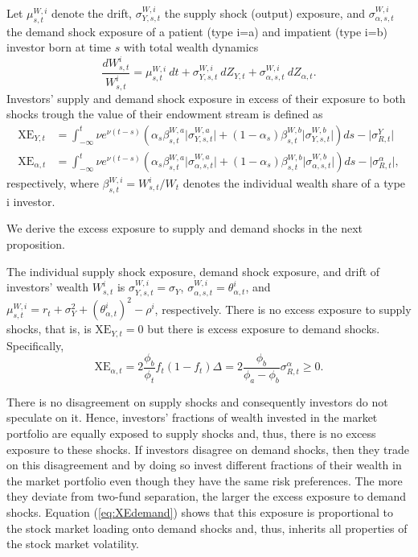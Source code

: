  \begin{defn}\label{Def:TotExpsure}
 Let $\mu^{W,i}_{s,t}$ denote the drift, $\sigma^{W,i}_{Y,s,t}$ the supply shock (output) exposure, and $\sigma^{W,i}_{\alpha,s,t}$ the demand shock exposure of a patient (type i=a) and impatient (type i=b) investor born at time $s$ with total wealth dynamics
 \begin{equation} \label{eq:totwealthind}
 \frac{dW^i_{s,t}}{W^i_{s,t}} = \mu^{W,i}_{s,t} \:  dt + \sigma^{W,i}_{Y,s,t} \: dZ_{Y,t}  
	+ \sigma^{W,i}_{\alpha,s,t} \: dZ_{\alpha,t}.
\end{equation}
Investors' supply and demand shock exposure in excess of their exposure to both shocks trough the value of their endowment stream is defined as 
\begin{align}\label{eq:XE_Y}
   \text{XE}_{Y,t} &= \int_{-\infty}^{t} \nu e^{\nu \left(t-s\right)}\left(\alpha_s \beta^{W,a}_{s,t} \lvert  \sigma^{W,a}_{Y,s,t} \rvert 
 +\left(1-\alpha_s\right) \beta^{W,b}_{s,t} \lvert \sigma^{W,b}_{Y,s,t}  \rvert \right)ds  -  \lvert \sigma^{Y}_{R,t}\rvert \\
  \text{XE}_{\alpha,t} &= \int_{-\infty}^{t} \nu e^{\nu \left(t-s\right)}\left(\alpha_s \beta^{W,a}_{s,t}  \lvert \sigma^{W,a}_{\alpha,s,t} \rvert 
 +\left(1-\alpha_s\right)\beta^{W,b}_{s,t} \lvert  \sigma^{W,b}_{\alpha,s,t}  \rvert \right)ds -  \lvert \sigma^{\alpha}_{R,t}\rvert,
\end{align} 
respectively, where $\beta^{W,i}_{s,t} =  W^i_{s,t}/ W_t$ denotes the individual wealth share of a type i investor. 
\end{defn}
We derive the excess exposure to supply and demand shocks in the next proposition.
\begin{prop}\label{prop:Exposure}
 The individual supply shock exposure, demand shock exposure, and drift of investors' wealth $W^i_{s,t}$ is $ \sigma^{W,i}_{Y,s,t} = \sigma_Y$,  $\sigma^{W,i}_{\alpha,s,t} = \theta_{\alpha,t}^i$, and $\mu^{W,i}_{s,t} =  r_t +\sigma_Y^2+\left( \theta_{\alpha,t}^i \right)^2 -\rho^i$, respectively. 
There is no excess exposure to supply shocks, that is,  is $\text{XE}_{Y,t} =0$ but there is excess exposure to demand shocks. Specifically,
 \begin{equation}\label{eq:XEdemand}
	\text{XE}_{\alpha,t}= 2 \frac{\phi_b}{\phi_t}  f_t  \left(1-f_t\right) \Delta = 2 \frac{\phi_b}{\phi_a-\phi_b} \sigma^{\alpha}_{R,t} \geq 0. 
\end{equation}
\end{prop} 
There is no disagreement on supply shocks and consequently investors do not speculate on it. Hence, investors' fractions of wealth invested in the market portfolio are equally exposed to supply shocks and, thus, there is no excess exposure to these shocks. If investors disagree on demand shocks, then they trade on this disagreement and by doing so invest different fractions of their wealth in the market portfolio even though they have the same risk preferences. The more they deviate from two-fund separation, the larger the excess exposure to demand shocks.   Equation (\ref{eq:XEdemand}) shows that this exposure is  proportional to the stock market loading onto demand shocks and, thus, inherits all properties of the stock market volatility. 

